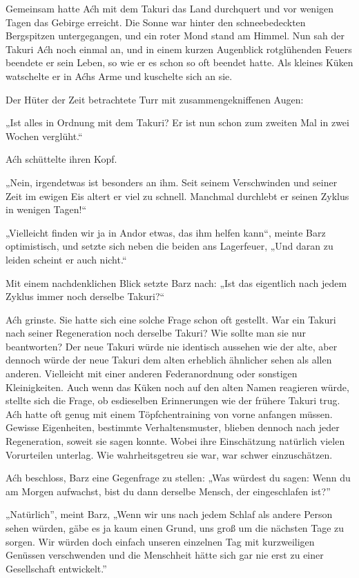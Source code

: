 Gemeinsam hatte Aćh mit dem Takuri das Land durchquert und vor wenigen Tagen das Gebirge erreicht. Die Sonne war hinter den schneebedeckten Bergspitzen untergegangen, und ein roter Mond stand am Himmel. Nun sah der Takuri Aćh noch einmal an, und in einem kurzen Augenblick rotglühenden Feuers beendete er sein Leben, so wie er es schon so oft beendet hatte. Als kleines Küken watschelte er in Aćhs Arme und kuschelte sich an sie.

Der Hüter der Zeit betrachtete Turr mit zusammengekniffenen Augen:

„Ist alles in Ordnung mit dem Takuri? Er ist nun schon zum zweiten Mal in zwei Wochen verglüht.“

Aćh schüttelte ihren Kopf.

„Nein, irgendetwas ist besonders an ihm. Seit seinem Verschwinden und seiner Zeit im ewigen Eis altert er viel zu schnell. Manchmal durchlebt er seinen Zyklus in wenigen Tagen!“

„Vielleicht finden wir ja in Andor etwas, das ihm helfen kann“, meinte Barz optimistisch, und setzte sich neben die beiden ans Lagerfeuer, „Und daran zu leiden scheint er auch nicht.“

Mit einem nachdenklichen Blick setzte Barz nach: „Ist das eigentlich nach jedem Zyklus immer noch derselbe Takuri?“

Aćh grinste. Sie hatte sich eine solche Frage schon oft gestellt. War ein Takuri nach seiner Regeneration noch derselbe Takuri? Wie sollte man sie nur beantworten? Der neue Takuri würde nie identisch aussehen wie der alte, aber dennoch würde der neue Takuri dem alten erheblich ähnlicher sehen als allen anderen. Vielleicht mit einer anderen Federanordnung oder sonstigen Kleinigkeiten. Auch wenn das Küken noch auf den alten Namen reagieren würde, stellte sich die Frage, ob esdieselben Erinnerungen wie der frühere Takuri trug. Aćh hatte oft genug mit einem Töpfchentraining von vorne anfangen müssen. Gewisse Eigenheiten, bestimmte Verhaltensmuster, blieben dennoch nach jeder Regeneration, soweit sie sagen konnte. Wobei ihre Einschätzung natürlich vielen Vorurteilen unterlag. Wie wahrheitsgetreu sie war, war schwer einzuschätzen.

Aćh beschloss, Barz eine Gegenfrage zu stellen: „Was würdest du sagen: Wenn du am Morgen aufwachst, bist du dann derselbe Mensch, der eingeschlafen ist?”

„Natürlich”, meint Barz, „Wenn wir uns nach jedem Schlaf als andere Person sehen würden, gäbe es ja kaum einen Grund, uns groß um die nächsten Tage zu sorgen. Wir würden doch einfach unseren einzelnen Tag mit kurzweiligen Genüssen verschwenden und die Menschheit hätte sich gar nie erst zu einer Gesellschaft entwickelt.”

